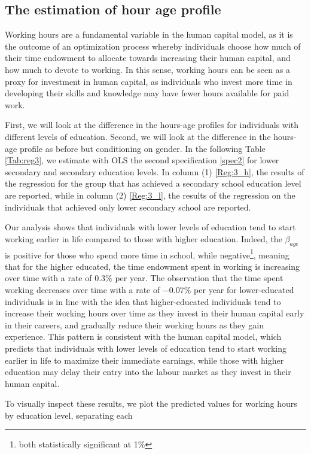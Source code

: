 \documentclass[12pt]{article}
\begin{document}
\subsection{The estimation of hour age profile}
Working hours are a fundamental variable in the human capital model, as it is the outcome of an optimization process
whereby individuals choose how much of their time endowment to allocate towards increasing their human capital, and how
much to devote to working. In this sense, working hours can be seen as a proxy for investment in human capital, as
individuals who invest more time in developing their skills and knowledge may have fewer hours available for paid
work.\par
First, we will look at the difference in the hours-age profiles for individuals with different levels of education.
Second, we will look at the difference in the hours-age profile as before but conditioning on gender. In the following
Table \ref{Tab:reg3}, we estimate with OLS the second specification \ref{spec2} for lower secondary and secondary
education levels. In column (1) \ref{Reg:3_h}, the results of the regression for the group that has achieved a secondary
school education level are reported, while in column (2) \ref{Reg:3_l}, the results of the regression on the individuals
that achieved only lower secondary school are reported.
\par
Our analysis shows that individuals with lower levels of education tend to start working earlier in life compared to
those with higher education. Indeed, the $\beta_{age}$ is positive for those who spend more time in school, while
negative\footnote{both statistically significant at 1\%}, meaning that for the higher educated, the time endowment spent in working is increasing over time with
a rate of $0.3\%$ per year.  The observation that the time spent working decreases over time with a rate of $-0.07\%$ per
year for lower-educated individuals is in line with the idea that higher-educated individuals tend to increase their
working hours over time as they invest in their human capital early in their careers, and gradually reduce their working
hours as they gain experience. This pattern is consistent with the human capital model, which predicts that individuals
with lower levels of education tend to start working earlier in life to maximize their immediate earnings, while those
with higher education may delay their entry into the labour market as they invest in their human capital.
\par
To visually inspect these results, we plot the predicted values for working hours by education level, separating each
\end{document}
